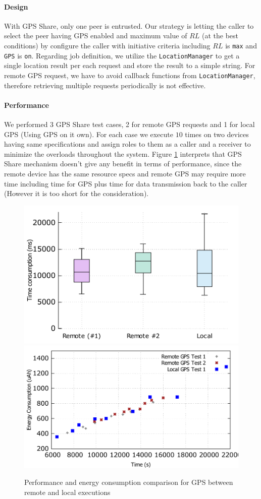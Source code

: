 \documentclass[conference]{IEEEtran}
\begin{document}
\paragraph{Design}
With GPS Share, only one peer is entrusted. Our strategy is letting the caller to select the peer having GPS enabled and maximum value of $RL$ (at the best conditions) by configure the caller with initiative criteria including $RL$ is \texttt{max} and \texttt{GPS} is \texttt{on}. Regarding job definition, we utilize the \texttt{LocationManager} to get a single location result per each request and store the result to a simple string. For remote GPS request, we have to avoid callback functions from \texttt{LocationManager}, therefore retrieving multiple requests periodically is not effective.


\paragraph{Performance}
We performed 3 GPS Share test cases, 2 for remote GPS requests and 1 for local GPS (Using GPS on it own). For each case we execute $10$ times on two devices having same specifications and assign roles to them as a caller and a receiver to minimize the overloads throughout the system. Figure \ref{fig:gps_perf} interprets that GPS Share mechanism doesn't give any benefit in terms of performance, since the remote device has the same resource specs and remote GPS may require more time including time for GPS plus time for data transmission back to the caller (However it is too short for the consideration).

\begin{figure}
	\centering
		\includegraphics[width=.39\textwidth]{data/gps_perf.pdf}
		\includegraphics[width=.45\textwidth]{data/gps_energy_full.pdf}
	\caption{Performance and energy consumption comparison for GPS between remote and local executions}
	\label{fig:gps_perf}
\end{figure}
\end{document}
